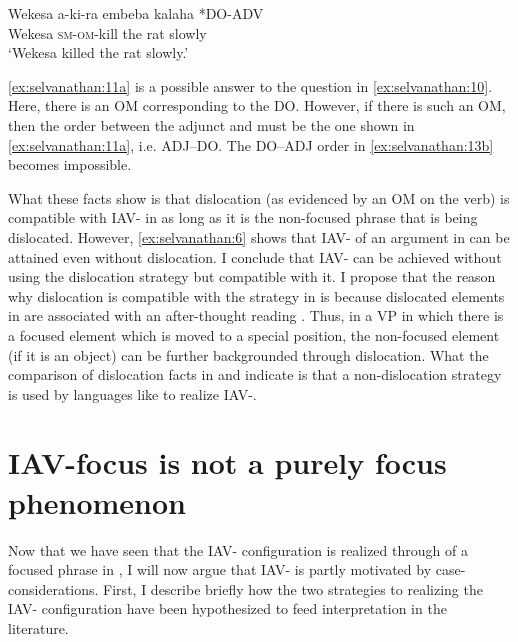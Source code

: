 \documentclass[output=paper
,newtxmath
,modfonts
,nonflat]{langsci/langscibook}
\begin{document}
\ex\label{ex:selvanathan:11b}
\gll *Wekesa  a-ki-ra   embeba  kalaha        *DO-ADV\\
Wekesa  \textsc{sm}{}-\textsc{om}{}-kill  {the rat}    slowly\\
\glt `Wekesa killed the rat slowly.'
\z
\z

\ref{ex:selvanathan:11a} is a possible answer to the question in \ref{ex:selvanathan:10}. Here, there is an OM corresponding to the DO. However, if there is such an OM, then the order between the adjunct and  must be the one shown in \ref{ex:selvanathan:11a}, i.e. ADJ–DO. The DO–ADJ order in \ref{ex:selvanathan:13b} becomes impossible.   

What these facts show is that dislocation (as evidenced by an OM on the verb) is compatible with IAV- in  as long as it is the non-focused phrase that is being dislocated. However, \ref{ex:selvanathan:6} shows that IAV- of an argument in  can be attained even without dislocation. I conclude that  IAV- can be achieved without using the dislocation strategy but compatible with it. I propose that the reason why dislocation is compatible with the  strategy in  is because dislocated elements in  are associated with an after-thought reading \citep{Diercks2013}. Thus, in a VP in which there is a focused element which is moved to a special position, the non-focused element (if it is an object) can be further backgrounded through dislocation. What the comparison of dislocation facts in  and  indicate is that a non-dislocation strategy is used by languages like  to realize IAV-.

\section{IAV-focus is not a purely focus phenomenon}\label{sec:selvanathan:4}

Now that we have seen that the IAV- configuration is realized through  of a focused phrase in , I will now argue that  IAV- is partly motivated by case-considerations. First, I describe briefly how the two strategies to realizing the IAV- configuration have been hypothesized to feed  interpretation in the literature.
\end{document}
